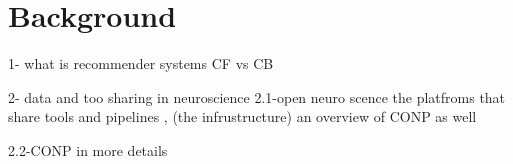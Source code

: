 \chapter{Background}
\label{background}

1- what is recommender systems
CF vs CB

2- data and too sharing in neuroscience
2.1-open neuro scence
the platfroms that share tools and pipelines , (the infrustructure)  an overview of CONP as well
 
2.2-CONP in more details